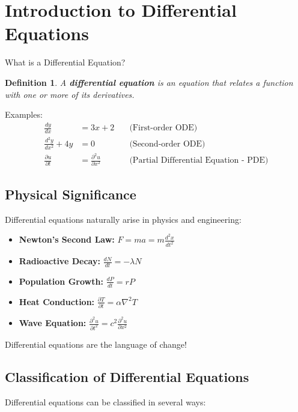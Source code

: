 \documentclass[12pt, letterpaper]{book}
\begin{document}
\section{Introduction to Differential Equations}
\label{sec:intro_diff_eq}

What is a Differential Equation?
\newtheorem{definition}{Definition}[chapter] %
\begin{definition}
    A \textbf{differential equation} is an equation that relates a function with one or more of its derivatives.
\end{definition}

Examples:
\begin{align}
    \frac{dy}{dx} &= 3x + 2 \quad &\text{(First-order ODE)} \label{eq:ex_first_order}\\
    \frac{d^2y}{dx^2} + 4y &= 0 \quad &\text{(Second-order ODE)} \label{eq:ex_second_order}\\
    \frac{\partial u}{\partial t} &= \frac{\partial^2 u}{\partial x^2} \quad &\text{(Partial Differential Equation - PDE)} \label{eq:ex_pde}
\end{align}

\subsection{Physical Significance}
\label{ssec:physical_significance}
Differential equations naturally arise in physics and engineering:
\begin{itemize}
    \item \textbf{Newton's Second Law:} $F = ma = m\frac{d^2x}{dt^2}$
    \item \textbf{Radioactive Decay:} $\frac{dN}{dt} = -\lambda N$
    \item \textbf{Population Growth:} $\frac{dP}{dt} = rP$
    \item \textbf{Heat Conduction:} $\frac{\partial T}{\partial t} = \alpha \nabla^2 T$
    \item \textbf{Wave Equation:} $\frac{\partial^2 u}{\partial t^2} = c^2 \frac{\partial^2 u}{\partial x^2}$
\end{itemize}
Differential equations are the language of change!

\subsection{Classification of Differential Equations}
\label{ssec:classification_de}
Differential equations can be classified in several ways:
\end{document}
